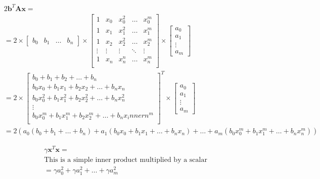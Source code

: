 \documentclass{article}
\newcommand{\x}{\mathbf{x}}
\newcommand{\A}{\mathbf{A}}
\newcommand{\B}{\mathbf{b}} %
\begin{document}
\begin{equation} \label{eqn:2bax}
\begin{split}
    & 2 \B ^T \A \x = \\
    & = 2 \times
    \begin{bmatrix}
        b_0 &
        b_1 &
        \ldots & 
        b_n
    \end{bmatrix}
    \times
    \begin{bmatrix}
        1 & x_0 & x_0 ^2 & \ldots & x_0^m \\
        1 & x_1 & x_1 ^2 & \ldots & x_1^m \\
        1 & x_2 & x_2 ^2 & \ldots & x_2^m \\
        \vdots & \vdots & \vdots & \ddots & \vdots \\
        1 & x_n & x_n ^n & \ldots & x_n^m \\
    \end{bmatrix}
    \times
    \begin{bmatrix}
        a_0\\
        a_1\\
        \vdots\\
        a_m
    \end{bmatrix}\\
    & = 2 \times
    \begin{bmatrix}
        b_0 + b_1 + b_2 + \ldots + b_n \\
        b_0 x_0 + b_1 x_1 + b_2 x_2 + \ldots + b_n x_n \\
        b_0 x_0^2 + b_1 x_1^2 + b_2 x_2^2 + \ldots + b_n x_n^2 \\
        \vdots\\
        b_0 x_0^m + b_1 x_1^m + b_2 x_2^m + \ldots + b_n x_innern^m \\
    \end{bmatrix} ^T
    \times
    \begin{bmatrix}
        a_0\\
        a_1\\
        \vdots\\
        a_m
    \end{bmatrix}\\
    & = 2(a_0 (b_0 + b_1 + \ldots + b_n) + a_1 (b_0 x_0 + b_1 x_1 + \ldots + b_n x_n) + \ldots + a_m (b_0 x_0^m + b_1 x_1^m + \ldots + b_n x_n^m))
\end{split}
\end{equation}

\begin{equation} \label{eqn:gxx}
\begin{split}
    & \gamma \x ^T \x = \\
    & \text{This is a simple inner product multiplied by a scalar} \\
    & = \gamma a_0 ^2 + \gamma a_1 ^2 + \ldots + \gamma a_m^2
\end{split}
\end{equation}
\end{document}
